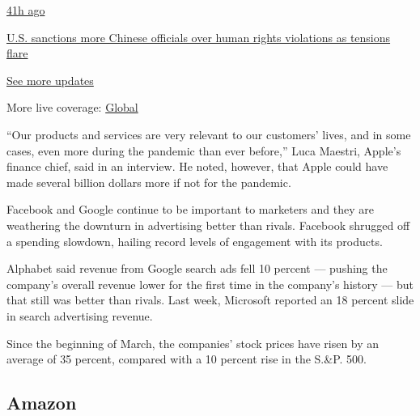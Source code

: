\href{https://www.nytimes3xbfgragh.onion/live/2020/07/31/business/stock-market-today-coronavirus?action=click\&pgtype=Article\&state=default\&region=MAIN_CONTENT_1\&context=storylines_live_updates\#us-sanctions-more-chinese-officials-over-human-rights-violations-as-tensions-flare}{41h
ago}

\href{https://www.nytimes3xbfgragh.onion/live/2020/07/31/business/stock-market-today-coronavirus?action=click\&pgtype=Article\&state=default\&region=MAIN_CONTENT_1\&context=storylines_live_updates\#us-sanctions-more-chinese-officials-over-human-rights-violations-as-tensions-flare}{U.S.
sanctions more Chinese officials over human rights violations as
tensions flare}

\href{https://www.nytimes3xbfgragh.onion/live/2020/07/31/business/stock-market-today-coronavirus?action=click\&pgtype=Article\&state=default\&region=MAIN_CONTENT_1\&context=storylines_live_updates}{See
more updates}

More live coverage:
\href{https://www.nytimes3xbfgragh.onion/2020/08/01/world/coronavirus-covid-19.html?action=click\&pgtype=Article\&state=default\&region=MAIN_CONTENT_1\&context=storylines_live_updates}{Global}

``Our products and services are very relevant to our customers' lives,
and in some cases, even more during the pandemic than ever before,''
Luca Maestri, Apple's finance chief, said in an interview. He noted,
however, that Apple could have made several billion dollars more if not
for the pandemic.

Facebook and Google continue to be important to marketers and they are
weathering the downturn in advertising better than rivals. Facebook
shrugged off a spending slowdown, hailing record levels of engagement
with its products.

Alphabet said revenue from Google search ads fell 10 percent --- pushing
the company's overall revenue lower for the first time in the company's
history --- but that still was better than rivals. Last week, Microsoft
reported an 18 percent slide in search advertising revenue.

Since the beginning of March, the companies' stock prices have risen by
an average of 35 percent, compared with a 10 percent rise in the S.\&P.
500.

\hypertarget{amazon}{%
\subsection{Amazon}\label{amazon}}

